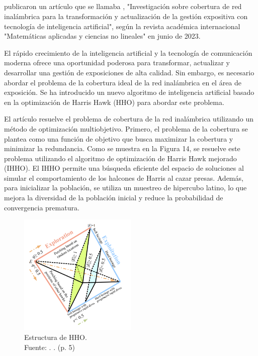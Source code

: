 \subsection{}
\cite{pr_dou2023researchwir} publicaron un artículo que se llamaba , "Investigación sobre cobertura de red inalámbrica para la transformación y actualización de la gestión expositiva con tecnología de inteligencia artificial", según la revista académica internacional "Matemáticas aplicadas y ciencias no lineales" en junio de 2023.

El rápido crecimiento de la inteligencia artificial y la tecnología de comunicación moderna ofrece una oportunidad poderosa para transformar, actualizar y desarrollar una gestión de exposiciones de alta calidad. Sin embargo, es necesario abordar el problema de la cobertura ideal de la red inalámbrica en el área de exposición. Se ha introducido un nuevo algoritmo de inteligencia artificial basado en la optimización de Harris Hawk (HHO) para abordar este problema.

El artículo resuelve el problema de cobertura de la red inalámbrica utilizando un método de optimización multiobjetivo. Primero, el problema de la cobertura se plantea como una función de objetivo que busca maximizar la cobertura y minimizar la redundancia. Como se muestra en la Figura 14, se resuelve este problema utilizando el algoritmo de optimización de Harris Hawk mejorado (IHHO). El IHHO permite una búsqueda eficiente del espacio de soluciones al simular el comportamiento de los halcones de Harris al cazar presas. Además, para inicializar la población, se utiliza un muestreo de hipercubo latino, lo que mejora la diversidad de la población inicial y reduce la probabilidad de convergencia prematura.

\begin{figure}[!ht]
	\begin{center}
		\includegraphics[width=0.5\textwidth]{2/figures/dou2023.png}
		\caption[Estructura de HHO]{Estructura de HHO.\\
		Fuente: \cite{pr_dou2023researchwir}. . (p. 5)}
		\label{2:fig123}
	\end{center}
\end{figure}


